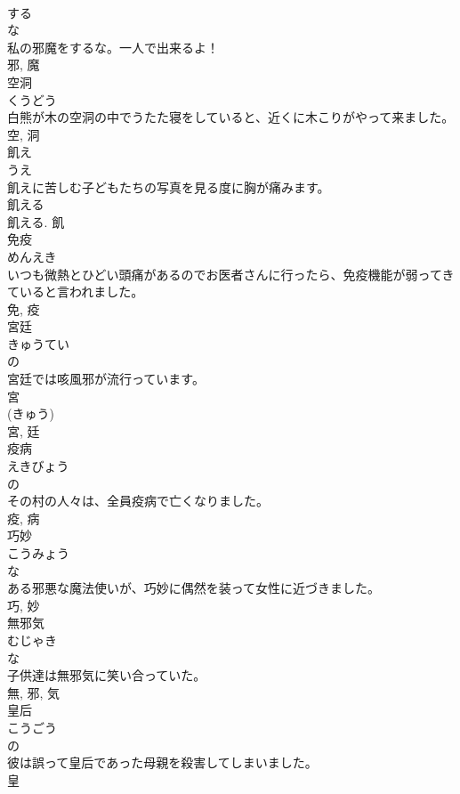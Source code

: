 \documentclass[8pt]{extreport}
\begin{document}
\begin{CJK}{UTF8}{min}
\\	する 
\\	な 
\\	私の邪魔をするな。一人で出来るよ！	
\\	邪, 魔	
\\	空洞	
\\	くうどう	
\\	白熊が木の空洞の中でうたた寝をしていると、近くに木こりがやって来ました。	
\\	空, 洞	
\\	飢え	
\\	うえ	
\\	飢えに苦しむ子どもたちの写真を見る度に胸が痛みます。	
\\	飢える 
\\	飢える.	飢	
\\	免疫	
\\	めんえき	
\\	いつも微熱とひどい頭痛があるのでお医者さんに行ったら、免疫機能が弱ってきていると言われました。	
\\	免, 疫	
\\	宮廷	
\\	きゅうてい	
\\	の 
\\	宮廷では咳風邪が流行っています。	
\\	宮 
\\	(きゅう) 
\\	宮, 廷	
\\	疫病	
\\	えきびょう	
\\	の 
\\	その村の人々は、全員疫病で亡くなりました。	
\\	疫, 病	
\\	巧妙	
\\	こうみょう	
\\	な 
\\	ある邪悪な魔法使いが、巧妙に偶然を装って女性に近づきました。	
\\	巧, 妙	
\\	無邪気	
\\	むじゃき	
\\	な 
\\	子供達は無邪気に笑い合っていた。	
\\	無, 邪, 気	
\\	皇后	
\\	こうごう	
\\	の 
\\	彼は誤って皇后であった母親を殺害してしまいました。	
\\	皇 

\end{CJK}
\end{document}
